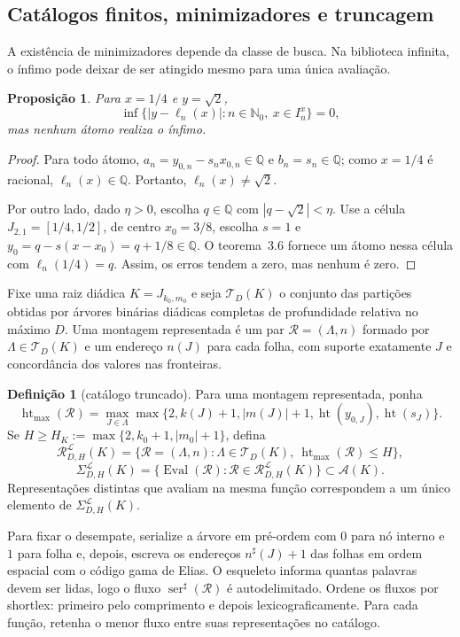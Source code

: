 \documentclass[11pt,a4paper]{article}
\theoremstyle{preciso}
\newtheorem{proposicao}[teorema]{Proposição}
\theoremstyle{definition}
\newtheorem{definicao}[teorema]{Definição}
\newcommand{\N}{\mathbb N}
\newcommand{\Q}{\mathbb Q}
\newcommand{\LL}{\mathcal L}
\newcommand{\Asm}{\mathcal A}
\newcommand{\RR}{\mathcal R}
\newcommand{\heightq}{\operatorname{ht}}
\newcommand{\Eval}{\operatorname{Eval}}
\newcommand{\ser}{\operatorname{ser}}
\newcommand{\eqn}[2]{\begin{equation}\label{eq:#1}#2\end{equation}}
\begin{document}
\subsection{Catálogos finitos, minimizadores e truncagem}
A existência de minimizadores depende da classe de busca. Na biblioteca infinita, o ínfimo pode deixar de ser atingido mesmo para uma única avaliação.
\begin{proposicao}
Para $x=1/4$ e $y=\sqrt2$,
\[
\inf\{|y-\ell_n(x)|:n\in\N_0,\ x\in I_n^x\}=0,
\]
mas nenhum átomo realiza o ínfimo.
\end{proposicao}
\begin{proof}
Para todo átomo, $a_n=y_{0,n}-s_nx_{0,n}\in\Q$ e $b_n=s_n\in\Q$; como $x=1/4$ é racional, $\ell_n(x)\in\Q$. Portanto, $\ell_n(x)\ne\sqrt2$.

Por outro lado, dado $\eta>0$, escolha $q\in\Q$ com $|q-\sqrt2|<\eta$. Use a célula $J_{2,1}=[1/4,1/2]$, de centro $x_0=3/8$, escolha $s=1$ e $y_0=q-s(x-x_0)=q+1/8\in\Q$. O teorema~3.6 fornece um átomo nessa célula com $\ell_n(1/4)=q$. Assim, os erros tendem a zero, mas nenhum é zero.
\end{proof}
Fixe uma raiz diádica $K=J_{k_0,m_0}$ e seja $\mathcal T_D(K)$ o conjunto das partições obtidas por árvores binárias diádicas completas de profundidade relativa no máximo $D$. Uma montagem representada é um par $\mathscr R=(\Lambda,n)$ formado por $\Lambda\in\mathcal T_D(K)$ e um endereço $n(J)$ para cada folha, com suporte exatamente $J$ e concordância dos valores nas fronteiras.

\begin{definicao}[catálogo truncado]
Para uma montagem representada, ponha
\[
\heightq_{\max}(\mathscr R)=
\max_{J\in\Lambda}\max\{2,k(J)+1,|m(J)|+1,\heightq(y_{0,J}),\heightq(s_J)\}.
\]
Se $H\ge H_K:=\max\{2,k_0+1,|m_0|+1\}$, defina
\eqn{91}{\RR^{\LL}_{D,H}(K)=
\{\mathscr R=(\Lambda,n):\Lambda\in\mathcal T_D(K),\ \heightq_{\max}(\mathscr R)\le H\},}
\eqn{92}{\Sigma^{\LL}_{D,H}(K)=
\{\Eval(\mathscr R):\mathscr R\in\RR^{\LL}_{D,H}(K)\}\subset\Asm(K).}
Representações distintas que avaliam na mesma função correspondem a um único elemento de $\Sigma^{\LL}_{D,H}(K)$.
\end{definicao}
Para fixar o desempate, serialize a árvore em pré-ordem com $0$ para nó interno e $1$ para folha e, depois, escreva os endereços $n^\sharp(J)+1$ das folhas em ordem espacial com o código gama de Elias. O esqueleto informa quantas palavras devem ser lidas, logo o fluxo $\ser^\sharp(\mathscr R)$ é autodelimitado. Ordene os fluxos por shortlex: primeiro pelo comprimento e depois lexicograficamente. Para cada função, retenha o menor fluxo entre suas representações no catálogo.
\end{document}
